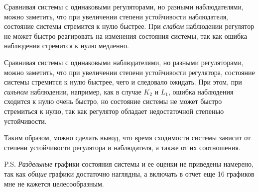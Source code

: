 Сравнивая системы с одинаковыми регуляторами, но разными наблюдателями, можно заметить, что
при увеличении степени устойчивости наблюдателя, состояние системы стремится к нулю быстрее. 
При \textit{слабом} наблюдении регулятор не может быстро реагировать на изменения состояния системы,
так как ошибка наблюдения стремится к нулю медленно. 

Сравнивая системы с одинаковыми наблюдателями, но разными регуляторами, можно заметить, что
при увеличении степени устойчивости регулятора, состояние системы стремится к нулю быстрее, 
чего и следовало ожидать. При этом, при \textit{сильном} наблюдении, например, как 
в случае $K_2$ и $L_1$, ошибка наблюдения сходится к нулю очень быстро, 
но состояние системы не может быстро стремиться к нулю, так как регулятор обладает 
недостаточной степенью устойчивости.    

Таким образом, можно сделать вывод, что время сходимости системы зависит от
степени устойчивости регулятора и наблюдателя, а также от их соотношения. 

P.S. \textit{Раздельные} графики состояния системы и ее оценки не приведены 
намерено, так как \textit{общие} графики достаточно наглядны, а включать в отчет еще 16 графиков 
мне не кажется целесообразным.  